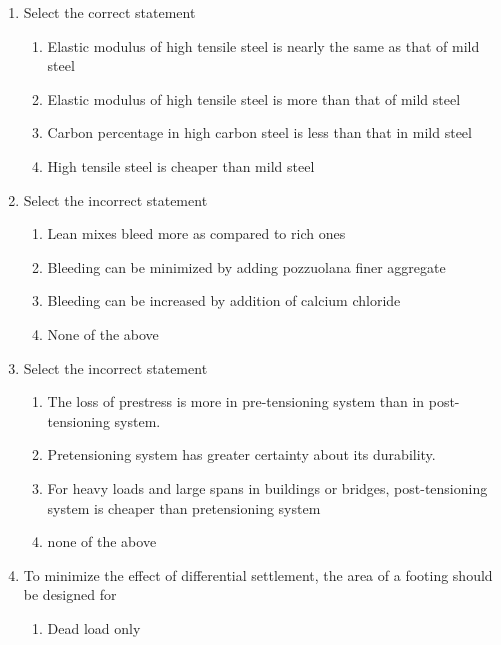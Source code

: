 \documentclass[11pt,a4paper]{article}
\begin{document}
\begin{enumerate}
{The correct answer is}
\begin{enumerate}[label=\Alph*.]
\item{Only (ii) is correct}
\item{(i) and (ii) are correct}
\item{(iii) and (iv) are correct}
\item{Only (iv) is correct}
\end{enumerate}
\item{Select the correct statement}
\begin{enumerate}[label=\Alph*.]
\item{Elastic modulus of high tensile steel is nearly the same as that of mild steel}
\item{Elastic modulus of high tensile steel is more than that of mild steel}
\item{Carbon percentage in high carbon steel is less than that in mild steel}
\item{High tensile steel is cheaper than mild steel}
\end{enumerate}
\item{Select the incorrect statement}
\begin{enumerate}[label=\Alph*.]
\item{Lean mixes bleed more as compared to rich ones}
\item{Bleeding can be minimized by adding pozzuolana finer aggregate}
\item{Bleeding can be increased by addition of calcium chloride}
\item{None of the above}
\end{enumerate}
\item{Select the incorrect statement}
\begin{enumerate}[label=\Alph*.]
\item{The loss of prestress is more in pre-tensioning system than in post-tensioning system.}
\item{Pretensioning system has greater certainty about its durability.}
\item{For heavy loads and large spans in buildings or bridges, post-tensioning system is cheaper than pretensioning system}
\item{none of the above}
\end{enumerate}
\item{To minimize the effect of differential settlement, the area of a footing should be designed for}
\begin{enumerate}[label=\Alph*.]
\item{Dead load only}

\end{enumerate}
\end{enumerate}
\end{document}
